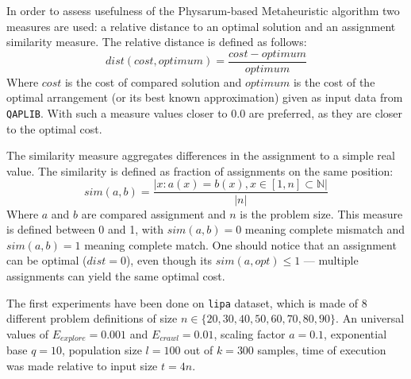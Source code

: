\documentclass[english,a4paper,twoside]{ppfcmthesis}
\begin{document}
In order to assess usefulness of the Physarum-based Metaheuristic algorithm two measures are used: a relative distance to an optimal solution and an assignment similarity measure. The relative distance is defined as follows:
\begin{equation}
  dist(cost, optimum) = \frac{cost - optimum}{optimum}
\end{equation}
Where $cost$ is the cost of compared solution and $optimum$ is the cost of the optimal arrangement (or its best known approximation) given as input data from \texttt{QAPLIB}. With such a measure values closer to $0.0$ are preferred, as they are closer to the optimal cost.

The similarity measure aggregates differences in the assignment to a simple real value. The similarity is defined as fraction of assignments on the same position:
\begin{equation}
  sim(a, b) = \frac{| x : a(x) = b(x), x \in [1, n] \subset \mathbb{N}|}{|n|}
\end{equation}
Where $a$ and $b$ are compared assignment and $n$ is the problem size. This measure is defined between 0 and 1, with $sim(a, b) = 0$ meaning complete mismatch and $sim(a, b) = 1$ meaning complete match. One should notice that an assignment can be optimal ($dist=0$), even though its $sim(a, opt) \leq 1$ --- multiple assignments can yield the same optimal cost.

The first experiments have been done on \texttt{lipa} dataset, which is made of 8 different problem definitions of size $n \in \{20, 30, 40, 50, 60, 70, 80, 90\}$. An universal values of $E_{explore}=0.001$ and $E_{crawl}=0.01$, scaling factor $a=0.1$, exponential base $q=10$, population size $l=100$ out of $k=300$ samples, time of execution was made relative to input size $t=4n$.
\end{document}
